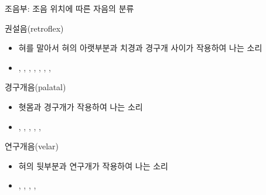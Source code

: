 \documentclass[11pt, aspectratio=169]{beamer}
\newcommand{\textds}[1]{{\ipafont #1}}
\begin{document}
\begin{frame}[t]{조음부: 조음 위치에 따른 자음의 분류}
    \begin{block}{권설음(retroflex)}
        \begin{itemize}
            \item 혀를 말아서 혀의 아랫부분과 치경과 경구개 사이가 작용하여 나는 소리
            \item \textds{[ʈ]}, \textds{[ɖ]}, \textds{[ɳ]}, \textds{[ʂ]}, \textds{[ʐ]}, \textds{[ɻ]}, \textds{[ɭ]}, \textds{[ɽ]}
        \end{itemize}
    \end{block}
    \begin{block}{경구개음(palatal)}
        \begin{itemize}
            \item 혓몸과 경구개가 작용하여 나는 소리
            \item \textds{[c]}, \textds{[ɟ]}, \textds{[ɲ]}, \textds{[ʎ]}, \textds{[ç]}, \textds{[j]}
        \end{itemize}
    \end{block}
    \begin{block}{연구개음(velar)}
        \begin{itemize}
            \item 혀의 뒷부분과 연구개가 작용하여 나는 소리
            \item \textds{[k]}, \textds{[g]}, \textds{[ŋ]}, \textds{[x]}, \textds{[ɣ]}
        \end{itemize}
    \end{block}
\end{frame}
\end{document}
